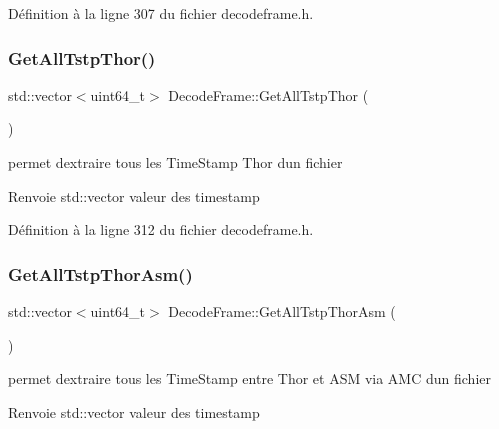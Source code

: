 Définition à la ligne 307 du fichier decodeframe.\+h.

\mbox{\label{class_decode_frame_aaf768149c11e4f8393af44b73c0163c9}} 
\subsubsection{\texorpdfstring{Get\+All\+Tstp\+Thor()}{GetAllTstpThor()}}
{\footnotesize\ttfamily std\+::vector$<$uint64\+\_\+t$>$ Decode\+Frame\+::\+Get\+All\+Tstp\+Thor (\begin{DoxyParamCaption}{ }\end{DoxyParamCaption})\hspace{0.3cm}{\ttfamily [inline]}}



permet d\textquotesingle{}extraire tous les Time\+Stamp Thor d\textquotesingle{}un fichier 

\begin{DoxyReturn}{Renvoie}
std\+::vector valeur des timestamp 
\end{DoxyReturn}


Définition à la ligne 312 du fichier decodeframe.\+h.

\mbox{\label{class_decode_frame_a93dc46d04d8ccfbb75284dfaf72b5b25}} 
\subsubsection{\texorpdfstring{Get\+All\+Tstp\+Thor\+Asm()}{GetAllTstpThorAsm()}}
{\footnotesize\ttfamily std\+::vector$<$uint64\+\_\+t$>$ Decode\+Frame\+::\+Get\+All\+Tstp\+Thor\+Asm (\begin{DoxyParamCaption}{ }\end{DoxyParamCaption})\hspace{0.3cm}{\ttfamily [inline]}}



permet d\textquotesingle{}extraire tous les Time\+Stamp entre Thor et A\+SM via A\+MC d\textquotesingle{}un fichier 

\begin{DoxyReturn}{Renvoie}
std\+::vector valeur des timestamp 
\end{DoxyReturn}


